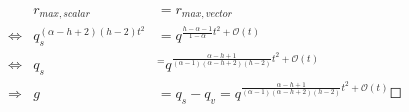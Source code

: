 \begin{eqnarray*}
 & r_{max,scalar} & =r_{max,vector}\\
\Leftrightarrow & q_{s}^{\left(\alpha-h+2\right)\left(h-2\right)t^{2}} & =q^{\frac{h-\alpha-1}{1-\alpha}t^{2}+\mathcal{O}(t)}\\
\Leftrightarrow & q_{s} & ^{=}q^{\frac{\alpha-h+1}{\left(\alpha-1\right)\left(\alpha-h+2\right)\left(h-2\right)}t^{2}+\mathcal{O}(t)}\\
\Rightarrow & g & =q_{s}-q_{v}=q^{\frac{\alpha-h+1}{\left(\alpha-1\right)\left(\alpha-h+2\right)\left(h-2\right)}t^{2}+\mathcal{O}(t)}\Square
\end{eqnarray*}

\clearpage